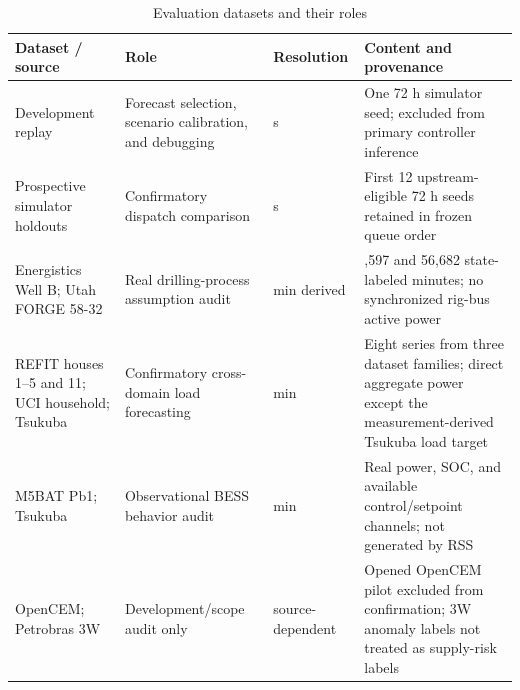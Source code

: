 \begin{table}[!t]
\caption{Evaluation datasets and their roles}
\label{tab:datasets}
\centering
\footnotesize
\begin{tabular}{@{}
  >{\raggedright\arraybackslash}p{}
  >{\raggedright\arraybackslash}p{}
  >{\raggedleft\arraybackslash}p{}
  >{\raggedright\arraybackslash}p{}@{}}
\toprule
\begin{minipage}[b]{\linewidth}\raggedright
Dataset / source
\end{minipage} & \begin{minipage}[b]{\linewidth}\raggedright
Role
\end{minipage} & \begin{minipage}[b]{\linewidth}\raggedleft
Resolution
\end{minipage} & \begin{minipage}[b]{\linewidth}\raggedright
Content and provenance
\end{minipage} \\
\midrule
Development replay & Forecast selection, scenario calibration, and debugging &
5 s & One 72 h simulator seed; excluded from primary controller inference \\
Prospective simulator holdouts & Confirmatory dispatch comparison & 5 s & First
12 upstream-eligible 72 h seeds retained in frozen queue order \\
Energistics Well B; Utah FORGE 58-32 & Real drilling-process assumption audit &
1 min derived & 18,597 and 56,682 state-labeled minutes; no synchronized rig-bus
active power \\
REFIT houses 1--5 and 11; UCI household; Tsukuba & Confirmatory cross-domain
load forecasting & 1 min & Eight series from three dataset families; direct aggregate
power except the measurement-derived Tsukuba load target \\
M5BAT Pb1; Tsukuba & Observational BESS behavior audit & 1 min & Real power,
SOC, and available control/setpoint channels; not generated by RSS \\
OpenCEM; Petrobras 3W & Development/scope audit only & source-dependent & Opened
OpenCEM pilot excluded from confirmation; 3W anomaly labels not treated as
supply-risk labels \\
\bottomrule
\end{tabular}
\end{table}


